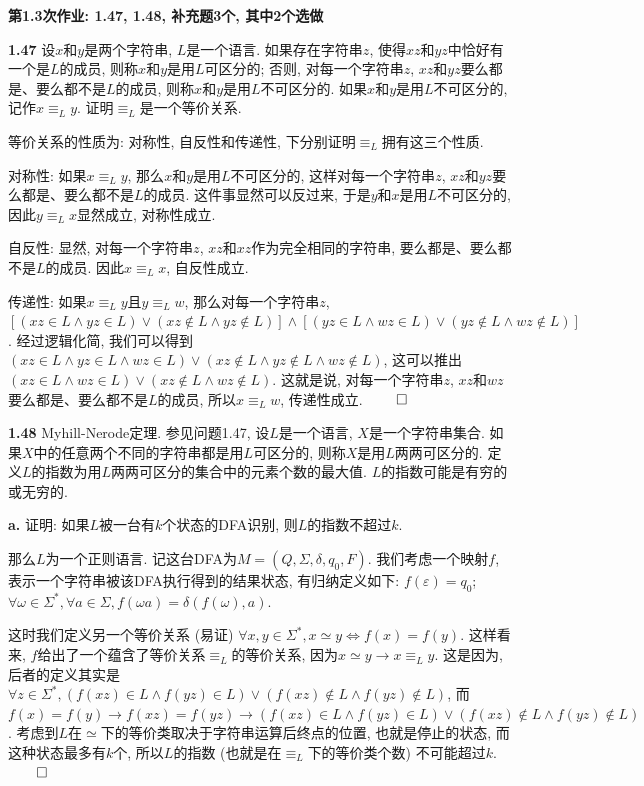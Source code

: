 \documentclass[UTF8]{report}
\newcommand{\problem}[1]{{\setlength{\parskip}{10pt}\noindent \bf{#1}}}
\renewenvironment{proof}{{\setlength{\parskip}{7pt}\noindent\hskip 2em \bf 证明 \quad}}{\hfill$\qed$\par}
\begin{document}
\textbf{第1.3次作业: 1.47, 1.48, 补充题3个, 其中2个选做}

\problem{1.47} 设$x$和$y$是两个字符串, $L$是一个语言. 如果存在字符串$z$, 使得$xz$和$yz$中恰好有一个是$L$的成员, 则称$x$和$y$是用$L$可区分的; 否则, 对每一个字符串$z$, $xz$和$yz$要么都是、要么都不是$L$的成员, 则称$x$和$y$是用$L$不可区分的. 如果$x$和$y$是用$L$不可区分的, 记作$x\equiv_L y$. 证明$\equiv_L$是一个等价关系. 

\begin{proof}
    等价关系的性质为: 对称性, 自反性和传递性, 下分别证明$\equiv_L$拥有这三个性质.

    对称性: 如果$x\equiv_L y$, 那么$x$和$y$是用$L$不可区分的, 这样对每一个字符串$z$, $xz$和$yz$要么都是、要么都不是$L$的成员. 这件事显然可以反过来, 于是$y$和$x$是用$L$不可区分的, 因此$y\equiv_L x$显然成立, 对称性成立.

    自反性: 显然, 对每一个字符串$z$, $xz$和$xz$作为完全相同的字符串, 要么都是、要么都不是$L$的成员. 因此$x\equiv_L x$, 自反性成立.

    传递性: 如果$x\equiv_L y$且$y\equiv_L w$, 那么对每一个字符串$z$, 
    $[(xz\in L \land yz\in L) \lor (xz\notin L \land yz\notin L)] \land [(yz\in L \land wz\in L) \lor (yz\notin L \land wz\notin L)]$. 经过逻辑化简, 我们可以得到$(xz\in L \land yz\in L \land wz\in L) \lor (xz\notin L \land yz\notin L \land wz\notin L)$, 这可以推出
    $(xz\in L \land wz\in L) \lor (xz\notin L \land wz\notin L)$. 这就是说, 对每一个字符串$z$, $xz$和$wz$要么都是、要么都不是$L$的成员, 所以$x\equiv_L w$, 传递性成立.
\end{proof}

\problem{1.48} Myhill-Nerode定理. 参见问题1.47, 设$L$是一个语言, $X$是一个字符串集合. 如果$X$中的任意两个不同的字符串都是用$L$可区分的, 则称$X$是用$L$两两可区分的. 定义$L$的指数为用$L$两两可区分的集合中的元素个数的最大值. $L$的指数可能是有穷的或无穷的. 

\problem{a.} 证明: 如果$L$被一台有$k$个状态的DFA识别, 则$L$的指数不超过$k$.

\begin{proof}
    那么$L$为一个正则语言. 记这台DFA为$M = (Q, \Sigma, \delta, q_0, F)$. 我们考虑一个映射$f$, 表示一个字符串被该DFA执行得到的结果状态, 有归纳定义如下:
    $f(\varepsilon) = q_0$;
    $\forall \omega\in\Sigma^*, \forall a\in\Sigma, f(\omega a) = \delta(f(\omega), a)$.

    这时我们定义另一个等价关系 (易证) $\forall x,y \in \Sigma^* , x\simeq y \Longleftrightarrow f(x) = f(y)$. 这样看来, $f$给出了一个蕴含了等价关系$\equiv_L$的等价关系, 因为$x\simeq y \rightarrow x\equiv_L y$. 这是因为, 后者的定义其实是$\forall z\in \Sigma^*, (f(xz)\in L\land f(yz)\in L) \lor (f(xz)\notin L\land f(yz)\notin L)$, 而$f(x) = f(y) \rightarrow f(xz) = f(yz) \rightarrow (f(xz)\in L\land f(yz)\in L) \lor (f(xz)\notin L\land f(yz)\notin L)$. 考虑到$L$在$\simeq$下的等价类取决于字符串运算后终点的位置, 也就是停止的状态, 而这种状态最多有$k$个, 所以$L$的指数 (也就是在$\equiv_L$下的等价类个数) 不可能超过$k$.
\end{proof}
\end{document}
